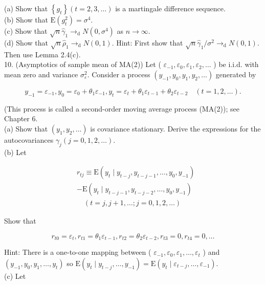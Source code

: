 \documentclass[10pt]{article}
\begin{document}
(a) Show that $\left\{g_{t}\right\}(t=2,3, \ldots)$ is a martingale difference sequence.\\
(b) Show that $\mathrm{E}\left(g_{t}^{2}\right)=\sigma^{4}$.\\
(c) Show that $\sqrt{n} \hat{\gamma}_{1} \rightarrow_{\mathrm{d}} N\left(0, \sigma^{4}\right)$ as $n \rightarrow \infty$.\\
(d) Show that $\sqrt{n} \hat{\rho}_{1} \rightarrow_{\mathrm{d}} N(0,1)$. Hint: First show that $\sqrt{n} \hat{\gamma}_{1} / \sigma^{2} \rightarrow_{\mathrm{d}} N(0,1)$. Then use Lemma 2.4(c).\\
10. (Asymptotics of sample mean of MA(2)) Let ( $\varepsilon_{-1}, \varepsilon_{0}, \varepsilon_{1}, \varepsilon_{2}, \ldots$ ) be i.i.d. with mean zero and variance $\sigma_{\varepsilon}^{2}$. Consider a process $\left(y_{-1}, y_{0}, y_{1}, y_{2}, \ldots\right)$ generated by

$$
y_{-1}=\varepsilon_{-1}, y_{0}=\varepsilon_{0}+\theta_{1} \varepsilon_{-1}, y_{t}=\varepsilon_{t}+\theta_{1} \varepsilon_{t-1}+\theta_{2} \varepsilon_{t-2} \quad(t=1,2, \ldots) .
$$

(This process is called a second-order moving average process (MA(2)); see Chapter 6.\\
(a) Show that $\left(y_{1}, y_{2}, \ldots\right)$ is covariance stationary. Derive the expressions for the autocovariances $\gamma_{j}(j=0,1,2, \ldots)$.\\
(b) Let

$$
\begin{aligned}
& r_{t j} \equiv \mathrm{E}\left(y_{t} \mid y_{t-j}, y_{t-j-1}, \ldots, y_{0}, y_{-1}\right) \\
& -\mathrm{E}\left(y_{t} \mid y_{t-j-1}, y_{t-j-2}, \ldots, y_{0}, y_{-1}\right) \\
& \quad(t=j, j+1, \ldots ; j=0,1,2, \ldots)
\end{aligned}
$$

Show that

$$
r_{t 0}=\varepsilon_{t}, r_{t 1}=\theta_{1} \varepsilon_{t-1}, r_{t 2}=\theta_{2} \varepsilon_{t-2}, r_{t 3}=0, r_{t 4}=0, \ldots
$$

Hint: There is a one-to-one mapping between ( $\varepsilon_{-1}, \varepsilon_{0}, \varepsilon_{1}, \ldots, \varepsilon_{t}$ ) and $\left(y_{-1}, y_{0}, y_{1}, \ldots, y_{t}\right)$ so $\mathrm{E}\left(y_{t} \mid y_{t-j}, \ldots, y_{-1}\right)=\mathrm{E}\left(y_{t} \mid \varepsilon_{t-j}, \ldots, \varepsilon_{-1}\right)$.\\
(c) Let
\end{document}
